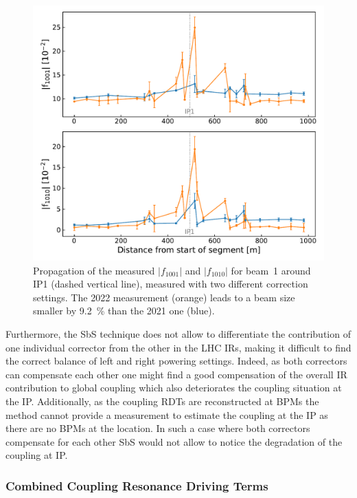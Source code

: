 \begin{figure}[!htb]
    \centering
    \includegraphics*[width=\textwidth]{Figures/IR_Coupling_Correction/sbs_coupling_b1_ir1_compare_2021_2022_colin_delta_minus4.pdf}
    \caption{Propagation of the measured \(|f_{1001}|\) and \(|f_{1010}|\) for beam~\num{1} around IP\num{1} (dashed vertical line), measured with two different correction settings. The \num{2022} measurement (\textcolor{mplorange}{orange}) leads to a beam size smaller by \qty{9.2}{\percent} than the \num{2021} one (\textcolor{mplblue}{blue}).}
    \label{figure:beamtest_vs_2022_sbs_abs_f1001_ir1}
\end{figure}

Furthermore, the SbS technique does not allow to differentiate the contribution of one individual corrector from the other in the LHC IRs, making it difficult to find the correct balance of left and right powering settings.
Indeed, as both correctors can compensate each other one might find a good compensation of the overall IR contribution to global coupling which also deteriorates the coupling situation at the IP.
Additionally, as the coupling RDTs are reconstructed at BPMs the method cannot provide a measurement to estimate the coupling at the IP as there are no BPMs at the location.
In such a case where both correctors compensate for each other SbS would not allow to notice the degradation of the coupling at IP.

\subsubsection*{Combined Coupling Resonance Driving Terms}

